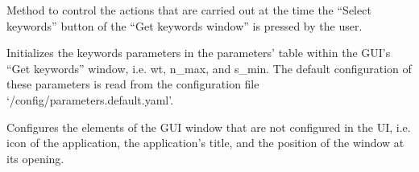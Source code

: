 \documentclass[letterpaper,10pt,english]{sphinxmanual}
\begin{document}
\begin{fulllineitems}

\begin{fulllineitems}
\label{\detokenize{gui_get_keywords_window:src.graphical_user_interface.get_keywords_window.GetKeywordsWindow.clicked_select_keywords}}
\sphinxAtStartPar
Method to control the actions that are carried out at the time the “Select keywords” button of the “Get
keywords window” is pressed by the user.

\end{fulllineitems}


\begin{fulllineitems}
\label{\detokenize{gui_get_keywords_window:src.graphical_user_interface.get_keywords_window.GetKeywordsWindow.init_params}}
\sphinxAtStartPar
Initializes the keywords parameters in the parameters’ table within the GUI’s “Get keywords” window,
i.e. wt, n\_max, and s\_min. The default configuration of these parameters is read from the configuration file
‘/config/parameters.default.yaml’.

\end{fulllineitems}


\begin{fulllineitems}
\label{\detokenize{gui_get_keywords_window:src.graphical_user_interface.get_keywords_window.GetKeywordsWindow.init_ui}}
\sphinxAtStartPar
Configures the elements of the GUI window that are not configured in the UI, i.e. icon of the application,
the application’s title, and the position of the window at its opening.

\end{fulllineitems}


\end{fulllineitems}
\end{document}
